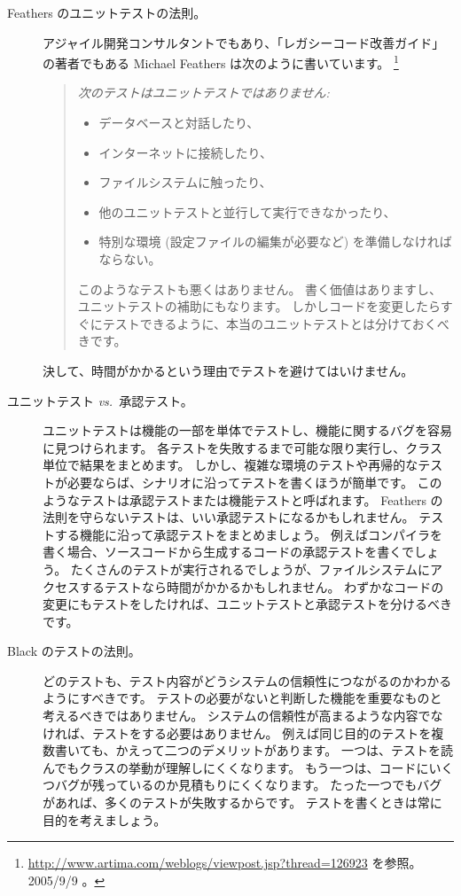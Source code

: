 \documentclass[a4paper,10pt,twoside]{book}
\begin{document}
\begin{description}
\item[Feathers のユニットテストの法則。]
  アジャイル開発コンサルタントでもあり、「レガシーコード改善ガイド」の著者でもある Michael Feathers は次のように書いています。 \footnote{\url{http://www.artima.com/weblogs/viewpost.jsp?thread=126923} を参照。 2005/9/9 。}
  \begin{quotation}
  \noindent
  {\it
  次のテストはユニットテストではありません:
  \begin{itemize}
	\item データベースと対話したり、
	\item インターネットに接続したり、
	\item ファイルシステムに触ったり、
	\item 他のユニットテストと並行して実行できなかったり、
	\item 特別な環境 (設定ファイルの編集が必要など) を準備しなければならない。
 \end{itemize}

このようなテストも悪くはありません。
書く価値はありますし、ユニットテストの補助にもなります。
しかしコードを変更したらすぐにテストできるように、本当のユニットテストとは分けておくべきです。

 }
  \end{quotation}

決して、時間がかかるという理由でテストを避けてはいけません。

 \item[ユニットテスト \textit{vs.}\ 承認テスト。] ユニットテストは機能の一部を単体でテストし、機能に関するバグを容易に見つけられます。
  各テストを失敗するまで可能な限り実行し、クラス単位で結果をまとめます。
  しかし、複雑な環境のテストや再帰的なテストが必要ならば、シナリオに沿ってテストを書くほうが簡単です。
  このようなテストは承認テストまたは機能テストと呼ばれます。
  Feathers の法則を守らないテストは、いい承認テストになるかもしれません。
  テストする機能に沿って承認テストをまとめましょう。
  例えばコンパイラを書く場合、ソースコードから生成するコードの承認テストを書くでしょう。
  たくさんのテストが実行されるでしょうが、ファイルシステムにアクセスするテストなら時間がかかるかもしれません。
  わずかなコードの変更にもテストをしたければ、ユニットテストと承認テストを分けるべきです。

\item[Black のテストの法則。]


  どのテストも、テスト内容がどうシステムの信頼性につながるのかわかるようにすべきです。
  テストの必要がないと判断した機能を重要なものと考えるべきではありません。
  システムの信頼性が高まるような内容でなければ、テストをする必要はありません。
  例えば同じ目的のテストを複数書いても、かえって二つのデメリットがあります。
  一つは、テストを読んでもクラスの挙動が理解しにくくなります。
  もう一つは、コードにいくつバグが残っているのか見積もりにくくなります。
  たった一つでもバグがあれば、多くのテストが失敗するからです。
  テストを書くときは常に目的を考えましょう。


\end{description}
\end{document}
